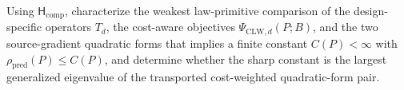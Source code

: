 Using \(\mathsf H_{\mathrm{comp}}\), characterize the weakest law-primitive comparison of the design-specific operators \(T_d\), the cost-aware objectives \(\Psi_{\mathrm{CLW},d}(P;B)\), and the two source-gradient quadratic forms that implies a finite constant \(C(P)<\infty\) with \(\rho_{\mathrm{pred}}(P)\le C(P)\), and determine whether the sharp constant is the largest generalized eigenvalue of the transported cost-weighted quadratic-form pair.